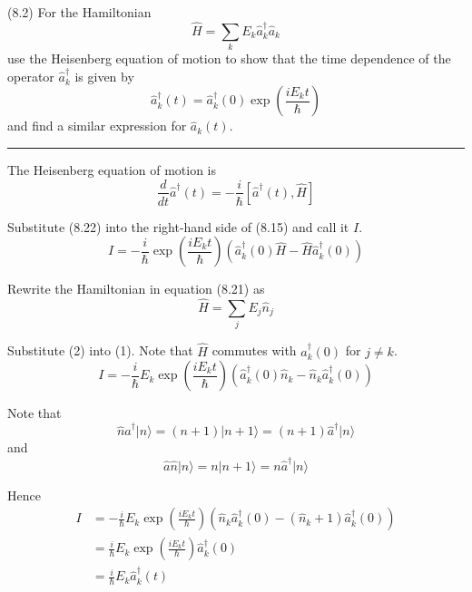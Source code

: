 \documentclass[12pt]{article}
\begin{document}
(8.2)
For the Hamiltonian
\begin{equation*}
\hat H=\sum_kE_k\hat a_k^\dag\hat a_k
\tag{8.21}
\end{equation*}
use the Heisenberg equation of motion to show that
the time dependence of the operator $\hat a_k^\dag$ is given by
\begin{equation*}
\hat a_k^\dag(t)=\hat a_k^\dag(0)\exp\left(\frac{iE_kt}{\hbar}\right)
\tag{8.22}
\end{equation*}
and find a similar expression for $\hat a_k(t)$.

\bigskip
\hrule

\bigskip
The Heisenberg equation of motion is
\begin{equation*}
\frac{d}{dt}\hat a^\dag(t)=-\frac{i}{\hbar}\left[\hat a^\dag(t),\hat H\right]
\tag{8.15}
\end{equation*}

Substitute (8.22) into the right-hand side of (8.15) and call it $I$.
\begin{equation*}
I=-\frac{i}{\hbar}\exp\left(\frac{iE_kt}{\hbar}\right)
\left(\hat a_k^\dag(0)\hat H-\hat H\hat a_k^\dag(0)\right)
\tag{1}
\end{equation*}

Rewrite the Hamiltonian in equation (8.21) as
\begin{equation*}
\hat H=\sum_jE_j\hat n_j
\tag{2}
\end{equation*}

Substitute (2) into (1). Note that $\hat H$ commutes with $\hat a_k^\dag(0)$ for $j\ne k$.
\begin{equation*}
I=-\frac{i}{\hbar}E_k\exp\left(\frac{iE_kt}{\hbar}\right)
\left(\hat a_k^\dag(0)\hat n_k-\hat n_k\hat a_k^\dag(0)\right)
\end{equation*}

Note that
\begin{equation*}
\hat n\hat a^\dag|n\rangle=(n+1)|n+1\rangle=(n+1)\hat a^\dag|n\rangle
\end{equation*}
and
\begin{equation*}
\hat a\hat n|n\rangle=n|n+1\rangle=n\hat a^\dag|n\rangle
\end{equation*}

Hence
\begin{align*}
I&=-\frac{i}{\hbar}E_k\exp\left(\frac{iE_kt}{\hbar}\right)
\left(\hat n_k\hat a_k^\dag(0)-(\hat n_k+1)\hat a_k^\dag(0)\right)
\\
&=\frac{i}{\hbar}E_k\exp\left(\frac{iE_kt}{\hbar}\right)\hat a_k^\dag(0)
\\
&=\frac{i}{\hbar}E_k\hat a_k^\dag(t)
\tag{3}
\end{align*}
\end{document}

